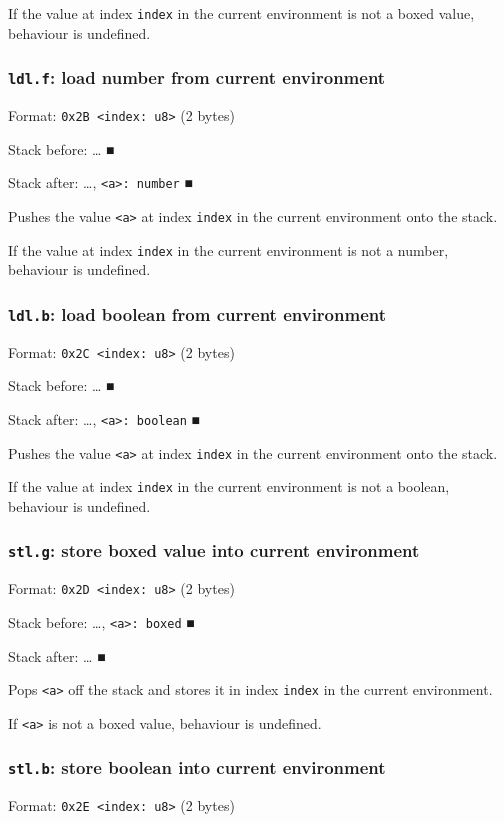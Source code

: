 \documentclass[11pt]{article}
\begin{document}
If the value at index \texttt{index} in the current environment is not a boxed
value, behaviour is undefined.

\subsubsection{\texttt{ldl.f}: load number from current environment}
\label{sec:orgb7a98c2}
Format: \texttt{0x2B <index: u8>} (2 bytes)

Stack before: \ldots{}​ ■

Stack after: \ldots{}​, \texttt{<a>: number} ■

Pushes the value \texttt{<a>} at index \texttt{index} in the current environment onto
the stack.

If the value at index \texttt{index} in the current environment is not a
number, behaviour is undefined.

\subsubsection{\texttt{ldl.b}: load boolean from current environment}
\label{sec:org671ebc7}
Format: \texttt{0x2C <index: u8>} (2 bytes)

Stack before: \ldots{}​ ■

Stack after: \ldots{}​, \texttt{<a>: boolean} ■

Pushes the value \texttt{<a>} at index \texttt{index} in the current environment onto
the stack.

If the value at index \texttt{index} in the current environment is not a
boolean, behaviour is undefined.

\subsubsection{\texttt{stl.g}: store boxed value into current environment}
\label{sec:org466d475}
Format: \texttt{0x2D <index: u8>} (2 bytes)

Stack before: \ldots{}​, \texttt{<a>: boxed} ■

Stack after: \ldots{}​ ■

Pops \texttt{<a>} off the stack and stores it in index \texttt{index} in the current
environment.

If \texttt{<a>} is not a boxed value, behaviour is undefined.

\subsubsection{\texttt{stl.b}: store boolean into current environment}
\label{sec:org711619f}
Format: \texttt{0x2E <index: u8>} (2 bytes)
\end{document}
